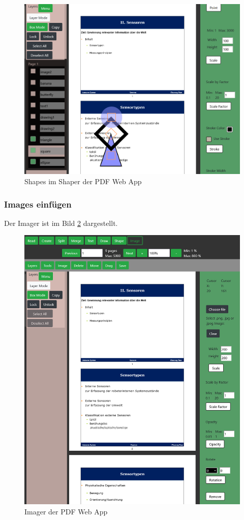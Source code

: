 \begin{figure}[!htbp]
	\centering
	\includegraphics[width=1\textwidth]{"images/shaping.png"}
	\caption{Shapes im Shaper der PDF Web App}
	\label{fig:shaping}
\end{figure}


\subsubsection{Images einfügen}
Der Imager ist im Bild \ref{fig:images} dargestellt. 

\begin{figure}[!htbp]
	\centering
	\includegraphics[width=1\textwidth]{"images/images.png"}
	\caption{Imager der PDF Web App}
	\label{fig:images}
\end{figure}

